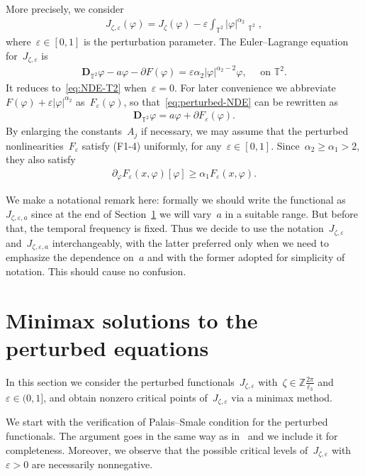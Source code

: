 \documentclass[10pt,a4paper]{amsart}
\newcommand{\p}{\partial}
\newcommand{\T}{\mathbb{T}}
\newcommand{\dd}{\mathop{}\!\mathrm{d}}
\newcommand{\eps}{\varepsilon}
\newcommand{\pD}{\mathbf{D}}
\newcommand{\bZ}{\mathbb{Z}}
\DeclareMathOperator{\dv}{\dd{vol}}
\begin{document}
More precisely, we consider 
\begin{align}\label{eq:perturbed-functional}
    J_{\zeta,\eps}(\varphi)
    =J_\zeta(\varphi)- \eps\int_{\T^2} |\varphi|^{\alpha_2}\dv_{\T^2},
\end{align}
where~$\eps\in[0,1]$ is the perturbation parameter. 
The Euler--Lagrange equation for~$J_{\zeta,\eps}$ is 
\begin{align}\label{eq:perturbed-NDE}
    \pD_{\T^2}\varphi-a\varphi - \p F(\varphi)= \eps \alpha_2 |\varphi|^{\alpha_2 -2 }\varphi, \quad \mbox{ on } \T^2. 
\end{align}
It reduces to~\eqref{eq:NDE-T2} when~$\eps= 0$. 
For later convenience we abbreviate~$F(\varphi)+\eps|\varphi|^{\alpha_2}$ as~$F_\eps(\varphi)$, so that~\eqref{eq:perturbed-NDE} can be rewritten as 
\begin{align}
    \pD_{\T^2}\varphi = a\varphi + \p F_\eps(\varphi).
\end{align}
By enlarging the constants~$A_j$ if necessary, we may assume that the perturbed nonlinearities~$F_\eps$ satisfy (F1-4) uniformly, for any~$\eps\in [0,1]$. 
Since~$\alpha_2\geq\alpha_1>2$, they also satisfy 
\begin{align}
    \p_\varphi F_\eps(x,\varphi)[\varphi] \geq \alpha_1 F_\eps(x,\varphi).
\end{align}

We make a notational remark here: formally we should write the functional as~$J_{\zeta,\eps,a}$ since at the end of Section~\ref{sect:perturbed solutions} we will vary~$a$ in a suitable range. 
But before that, the temporal frequency is fixed.
Thus we decide to use the notation~$J_{\zeta,\eps}$ and~$J_{\zeta,\eps, a}$ interchangeably, with the latter preferred only when we need to emphasize the dependence on~$a$ and with the former adopted for simplicity of notation. 
This should cause no confusion. 


\section{Minimax solutions to the perturbed equations}\label{sect:perturbed solutions}

In this section we consider the perturbed functionals~$J_{\zeta,\eps}$ with~$\zeta\in\bZ\frac{2\pi}{\ell_3}$ and~$\eps\in (0,1]$, and obtain nonzero critical points of~$J_{\zeta,\eps}$ via a minimax method. 


We start with the verification of Palais--Smale condition for the perturbed functionals.
The argument goes in the same way as in~\cite{WZ2026Stationary} and we include it for completeness. 
Moreover, we observe that the possible critical levels of~$J_{\zeta,\eps}$ with~$\eps>0$ are necessarily nonnegative. 
\end{document}
